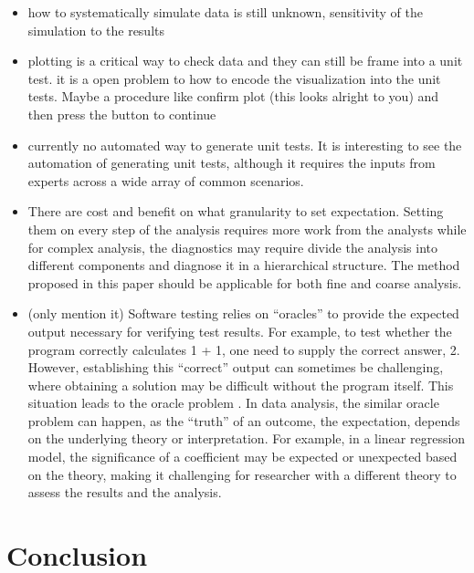 \documentclass[
]{jds}
\begin{document}
\begin{itemize}
\item
  how to systematically simulate data is still unknown, sensitivity of
  the simulation to the results
\item
  plotting is a critical way to check data and they can still be frame
  into a unit test. it is a open problem to how to encode the
  visualization into the unit tests. Maybe a procedure like confirm plot
  (this looks alright to you) and then press the button to continue
\item
  currently no automated way to generate unit tests. It is interesting
  to see the automation of generating unit tests, although it requires
  the inputs from experts across a wide array of common scenarios.
\item
  There are cost and benefit on what granularity to set expectation.
  Setting them on every step of the analysis requires more work from the
  analysts while for complex analysis, the diagnostics may require
  divide the analysis into different components and diagnose it in a
  hierarchical structure. The method proposed in this paper should be
  applicable for both fine and coarse analysis.
\item
  (only mention it) Software testing relies on ``oracles'' to provide
  the expected output necessary for verifying test results. For example,
  to test whether the program correctly calculates 1 + 1, one need to
  supply the correct answer, 2. However, establishing this ``correct''
  output can sometimes be challenging, where obtaining a solution may be
  difficult without the program itself. This situation leads to the
  oracle problem \citep{barr2014oracle}. In data analysis, the similar
  oracle problem can happen, as the ``truth'' of an outcome, the
  expectation, depends on the underlying theory or interpretation. For
  example, in a linear regression model, the significance of a
  coefficient may be expected or unexpected based on the theory, making
  it challenging for researcher with a different theory to assess the
  results and the analysis.
\end{itemize}

\section{Conclusion}\label{sec-conclusion}


\renewcommand\refname{References}
  
\end{document}
